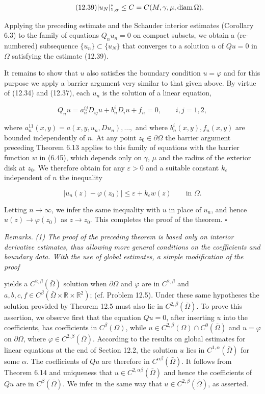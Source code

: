 \begin{equation}
\tag{12.39}
|u_N|_{1,\alpha}^* \le C=C(M,\gamma,\mu,\operatorname{diam} \Omega).
\end{equation}

Applying the preceding estimate and the Schauder interior estimates (Corollary
6.3) to the family of equations $Q_nu_n=0$ on compact subsets, we obtain a (re-
numbered) subsequence $\{u_n\}\subset \{u_N\}$ that converges to a solution $u$ of $Qu=0$ in
$\Omega$ satisfying the estimate (12.39).

It remains to show that $u$ also satisfies the boundary condition $u=\varphi$ and for
this purpose we apply a barrier argument very similar to that given above. By virtue
of (12.34) and (12.37), each $u_n$ is the solution of a linear equation,

\[
Q_nu=a_n^{ij}D_{ij}u+b_n^iD_iu+f_n=0,\qquad i,j=1,2,
\]

where $a_n^{11}(x,y)=a(x,y,u_n,Du_n),\ldots,$ and where $b_n^i(x,y), f_n(x,y)$ are bounded
independently of $n$. At any point $z_0\in \partial \Omega$ the barrier argument preceding Theorem
6.13 applies to this family of equations with the barrier function $w$ in (6.45), which
depends only on $\gamma$, $\mu$ and the radius of the exterior disk at $z_0$. We therefore obtain
for any $\varepsilon>0$ and a suitable constant $k_\varepsilon$ independent of $n$ the inequality

\[
|u_n(z)-\varphi(z_0)|\le \varepsilon+k_\varepsilon w(z)\qquad \text{in } \Omega.
\]

Letting $n\to \infty$, we infer the same inequality with $u$ in place of $u_n$, and hence
$u(z)\to \varphi(z_0)$ as $z\to z_0$. This completes the proof of the theorem. $\square$

\medskip

\noindent\textit{Remarks.} \textit{(1) The proof of the preceding theorem is based only on interior
derivative estimates, thus allowing more general conditions on the coefficients and
boundary data. With the use of global estimates, a simple modification of the proof}


yields a $C^{2,\beta}(\bar{\Omega})$ solution when $\partial\Omega$ and $\varphi$ are in $C^{2,\beta}$ and $a,b,c,f \in C^\beta(\bar{\Omega}\times \mathbb{R}\times \mathbb{R}^2)$;
(cf. Problem 12.5). Under these same hypotheses the solution provided by Theorem 12.5 must also lie in $C^{2,\beta}(\bar{\Omega})$. To prove this assertion, we observe first that the equation $Qu=0$, after inserting $u$ into the coefficients, has coefficients in $C^\beta(\Omega)$, while $u \in C^{2,\beta}(\Omega)\cap C^0(\bar{\Omega})$ and $u=\varphi$ on $\partial\Omega$, where $\varphi\in C^{2,\beta}(\bar{\Omega})$. According to the results on global estimates for linear equations at the end of Section 12.2, the solution $u$ lies in $C^{1,\alpha}(\bar{\Omega})$ for some $\alpha$. The coefficients of $Qu$ are therefore in $C^{\alpha\beta}(\bar{\Omega})$. It follows from Theorem 6.14 and uniqueness that $u\in C^{2,\alpha\beta}(\bar{\Omega})$ and hence the coefficients of $Qu$ are in $C^\beta(\bar{\Omega})$. We infer in the same way that $u\in C^{2,\beta}(\bar{\Omega})$, as asserted.

